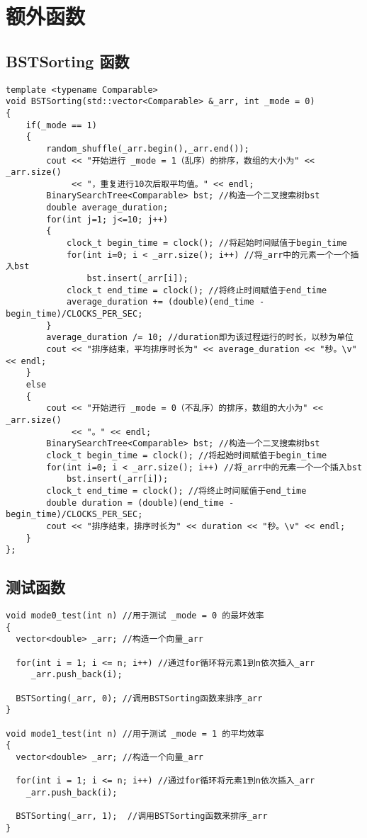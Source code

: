 \documentclass[UTF8]{ctexart}
\begin{document}
\newpage

\section{额外函数}

\subsection{BSTSorting 函数}

\begin{lstlisting}[language={[ANSI]C++}]
template <typename Comparable>
void BSTSorting(std::vector<Comparable> &_arr, int _mode = 0)
{
    if(_mode == 1)
    {
        random_shuffle(_arr.begin(),_arr.end());
        cout << "开始进行 _mode = 1（乱序）的排序，数组的大小为" << _arr.size() 
             << "，重复进行10次后取平均值。" << endl;
        BinarySearchTree<Comparable> bst; //构造一个二叉搜索树bst
        double average_duration;
        for(int j=1; j<=10; j++)
        {
            clock_t begin_time = clock(); //将起始时间赋值于begin_time
            for(int i=0; i < _arr.size(); i++) //将_arr中的元素一个一个插入bst
                bst.insert(_arr[i]);
            clock_t end_time = clock(); //将终止时间赋值于end_time
            average_duration += (double)(end_time - begin_time)/CLOCKS_PER_SEC;
        }
        average_duration /= 10; //duration即为该过程运行的时长，以秒为单位
        cout << "排序结束，平均排序时长为" << average_duration << "秒。\v" << endl;
    }
    else
    {
        cout << "开始进行 _mode = 0（不乱序）的排序，数组的大小为" << _arr.size() 
             << "。" << endl;
        BinarySearchTree<Comparable> bst; //构造一个二叉搜索树bst
        clock_t begin_time = clock(); //将起始时间赋值于begin_time
        for(int i=0; i < _arr.size(); i++) //将_arr中的元素一个一个插入bst
            bst.insert(_arr[i]);
        clock_t end_time = clock(); //将终止时间赋值于end_time
        double duration = (double)(end_time - begin_time)/CLOCKS_PER_SEC;
        cout << "排序结束，排序时长为" << duration << "秒。\v" << endl;
    }
};
\end{lstlisting}

\newpage

\subsection{测试函数}

\begin{lstlisting}[language={[ANSI]C++}]
void mode0_test(int n) //用于测试 _mode = 0 的最坏效率
{
  vector<double> _arr; //构造一个向量_arr
  
  for(int i = 1; i <= n; i++) //通过for循环将元素1到n依次插入_arr
     _arr.push_back(i);
     
  BSTSorting(_arr, 0); //调用BSTSorting函数来排序_arr
}

void mode1_test(int n) //用于测试 _mode = 1 的平均效率
{
  vector<double> _arr; //构造一个向量_arr
  
  for(int i = 1; i <= n; i++) //通过for循环将元素1到n依次插入_arr
    _arr.push_back(i);

  BSTSorting(_arr, 1);  //调用BSTSorting函数来排序_arr
}
\end{lstlisting}
\end{document}

